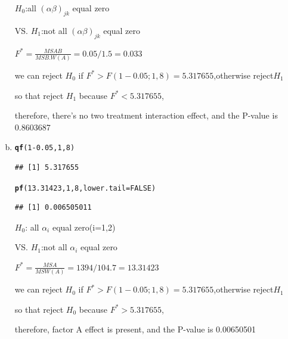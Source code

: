 \documentclass{article}\usepackage[]{graphicx}\usepackage[]{color}
\makeatletter
\newcommand{\hlnum}[1]{\textcolor[rgb]{0.686,0.059,0.569}{#1}}%
\newcommand{\hlopt}[1]{\textcolor[rgb]{0,0,0}{#1}}%
\newcommand{\hlstd}[1]{\textcolor[rgb]{0.345,0.345,0.345}{#1}}%
\newcommand{\hlkwc}[1]{\textcolor[rgb]{0.333,0.667,0.333}{#1}}%
\newcommand{\hlkwd}[1]{\textcolor[rgb]{0.737,0.353,0.396}{\textbf{#1}}}%
\newenvironment{kframe}{%
 \def\at@end@of@kframe{}%
 \ifinner\ifhmode%
  \def\at@end@of@kframe{\end{minipage}}%
  \begin{minipage}{\columnwidth}%
 \fi\fi%
 \def\FrameCommand##1{\hskip\@totalleftmargin \hskip-\fboxsep
 \colorbox{shadecolor}{##1}\hskip-\fboxsep
     \hskip-\linewidth \hskip-\@totalleftmargin \hskip\columnwidth}%
 \MakeFramed {\advance\hsize-\width
   \@totalleftmargin\z@ \linewidth\hsize
   \@setminipage}}%
 {\par\unskip\endMakeFramed%
 \at@end@of@kframe}
\newenvironment{knitrout}{}{} %
\makeatother
\begin{document}
\begin{enumerate}[(a)]
\begin{center}
$H_0$:all $(\alpha\beta)_{jk}$ equal zero

VS. $H_1$:not all $(\alpha\beta)_{jk}$ equal zero

$F^*=\frac{MSAB}{MSB.W(A)} = 0.05/1.5  = 0.033$

we can reject $H_0$ if $F^* > F(1-0.05; 1, 8)=5.317655$,otherwise reject$H_1$

so that reject $H_1$ because $F^*<5.317655$,

therefore, there's no two treatment interaction effect, and the P-value is 0.8603687
\end{center}

\item

\begin{knitrout}
\color{fgcolor}\begin{kframe}
\begin{alltt}
  \hlkwd{qf}\hlstd{(}\hlnum{1}\hlopt{-}\hlnum{0.05}\hlstd{,} \hlnum{1}\hlstd{,} \hlnum{8}\hlstd{)}
\end{alltt}
\begin{verbatim}
## [1] 5.317655
\end{verbatim}
\begin{alltt}
  \hlkwd{pf}\hlstd{(}\hlnum{13.31423}\hlstd{,} \hlnum{1}\hlstd{,} \hlnum{8}\hlstd{,} \hlkwc{lower.tail} \hlstd{=} \hlnum{FALSE}\hlstd{)}
\end{alltt}
\begin{verbatim}
## [1] 0.006505011
\end{verbatim}
\end{kframe}
\end{knitrout}

\begin{center}
$H_0$: all $\alpha_i$ equal zero(i=1,2)

VS. $H_1$:not all $\alpha_i$ equal zero

$F^*=\frac{MSA}{MSW(A)} = 1394/104.7  = 13.31423$

we can reject $H_0$ if $F^* > F(1-0.05;1,8)=5.317655$,otherwise reject$H_1$

so that reject $H_0$ because $F^*>5.317655$,

therefore, factor A effect is present, and the P-value is 0.00650501
\end{center}


\end{enumerate}
\end{document}
